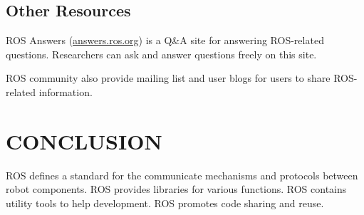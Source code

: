 \documentclass[a4paper, 10pt, conference]{ieeeconf}       %
\begin{document}
\subsection{Other Resources}
ROS Answers (\url{answers.ros.org}) is a Q\&A site for answering ROS-related questions. Researchers can ask and answer questions freely on this site.

ROS community also provide mailing list and user blogs for users to share ROS-related information.

\section{CONCLUSION}

   ROS defines a standard for the communicate mechanisms and protocols between robot components.
   ROS provides libraries for various functions.
   ROS contains utility tools to help development.
   ROS promotes code sharing and reuse.



  
\end{document}
